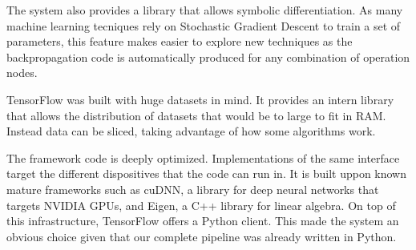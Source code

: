 The system also provides a library that allows symbolic differentiation. As many machine learning tecniques rely on Stochastic Gradient Descent to train a set of parameters, this feature makes easier to explore new techniques as the backpropagation code is automatically produced for any combination of operation nodes. 

TensorFlow was built with huge datasets in mind. It provides an intern library that allows the distribution of datasets that would be to large to fit in RAM. Instead data can be sliced, taking advantage of how some algorithms work.

The framework code is deeply optimized. Implementations of the same interface target the different dispositives that the code can run in. It is built uppon known mature frameworks such as cuDNN, a library for deep neural networks that targets NVIDIA GPUs, and Eigen, a C++ library for linear algebra. On top of this infrastructure, TensorFlow offers a Python client. This made the system an obvious choice given that our complete pipeline was already written in Python.













